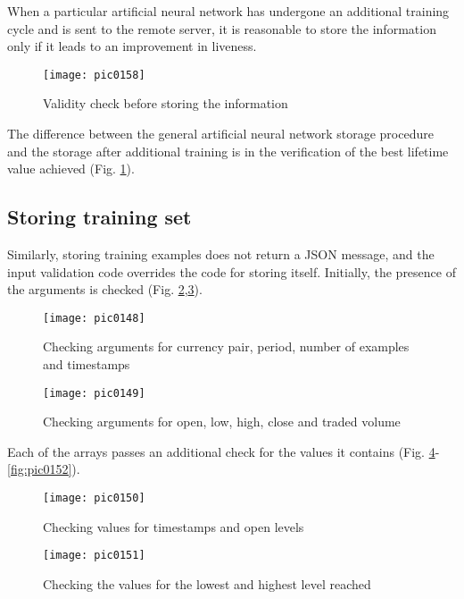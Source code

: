 When a particular artificial neural network has undergone an additional training cycle and is sent to the remote server, it is reasonable to store the information only if it leads to an improvement in liveness.

\begin{figure}[h]
\centering
\texttt{[image: pic0158]}
\caption{Validity check before storing the information}
\label{fig:pic0158}
\end{figure}
\FloatBarrier

The difference between the general artificial neural network storage procedure and the storage after additional training is in the verification of the best lifetime value achieved (Fig. \ref{fig:pic0158}).

\subsection{Storing training set}

Similarly, storing training examples does not return a JSON message, and the input validation code overrides the code for storing itself. Initially, the presence of the arguments is checked (Fig. \ref{fig:pic0148},\ref{fig:pic0149}).

\begin{figure}[h]
\centering
\texttt{[image: pic0148]}
\caption{Checking arguments for currency pair, period, number of examples and timestamps}
\label{fig:pic0148}
\end{figure}
\FloatBarrier

\begin{figure}[h]
\centering
\texttt{[image: pic0149]}
\caption{Checking arguments for open, low, high, close and traded volume}
\label{fig:pic0149}
\end{figure}
\FloatBarrier

Each of the arrays passes an additional check for the values it contains (Fig. \ref{fig:pic0150}-\ref{fig:pic0152}).

\begin{figure}[h]
\centering
\texttt{[image: pic0150]}
\caption{Checking values for timestamps and open levels}
\label{fig:pic0150}
\end{figure}
\FloatBarrier

\begin{figure}[h]
\centering
\texttt{[image: pic0151]}
\caption{Checking the values for the lowest and highest level reached}
\label{fig:pic0151}
\end{figure}
\FloatBarrier

